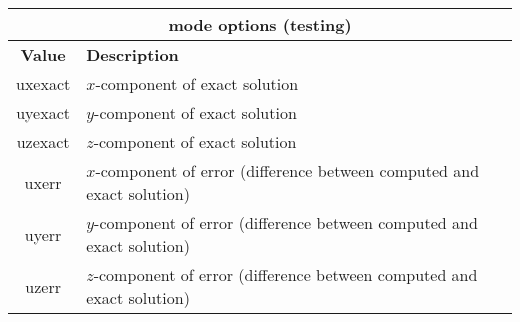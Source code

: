 \documentclass[11pt]{report}
\begin{document}
\begin{center}
\begin{tabular}{|c|l|} \hline
\multicolumn{2}{|c|}{\bf mode options (testing)}\\ \hline
\bf{Value} & \bf{Description} \\ 
\hline  \hline
uxexact & $x$-component of exact solution\\ \hline
uyexact & $y$-component of exact solution\\ \hline
uzexact & $z$-component of exact solution\\ \hline
uxerr   & $x$-component of error (difference between computed and exact solution)\\ \hline
uyerr   & $y$-component of error (difference between computed and exact solution)\\ \hline
uzerr   & $z$-component of error (difference between computed and exact solution)\\ \hline
\end{tabular}
\end{center}
\end{document}
